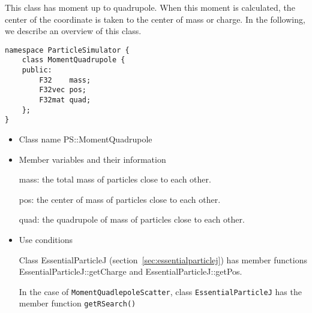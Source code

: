 
This class has moment up to quadrupole. When this moment is
calculated, the center of the coordinate is taken to the center of
mass or charge. In the following, we describe an overview of this
class.
\begin{screen}
\begin{verbatim}
namespace ParticleSimulator {
    class MomentQuadrupole {
    public:
        F32    mass;    
        F32vec pos;
        F32mat quad;
    };
}
\end{verbatim}
\end{screen}

\begin{itemize}
\item Class name
  PS::MomentQuadrupole

\item Member variables and their information

  mass: the total mass of particles close to each other.

  pos: the center of mass of particles close to each other.

  quad: the quadrupole of mass of particles close to each other.

\item Use conditions

  Class EssentialParticleJ (section~\ref{sec:essentialparticlej}) has
  member functions EssentialParticleJ::getCharge and
  EssentialParticleJ::getPos.

  In the case of \texttt{MomentQuadlepoleScatter},
  class \texttt{EssentialParticleJ} has the member function
  \texttt{getRSearch()}
  
\end{itemize}


